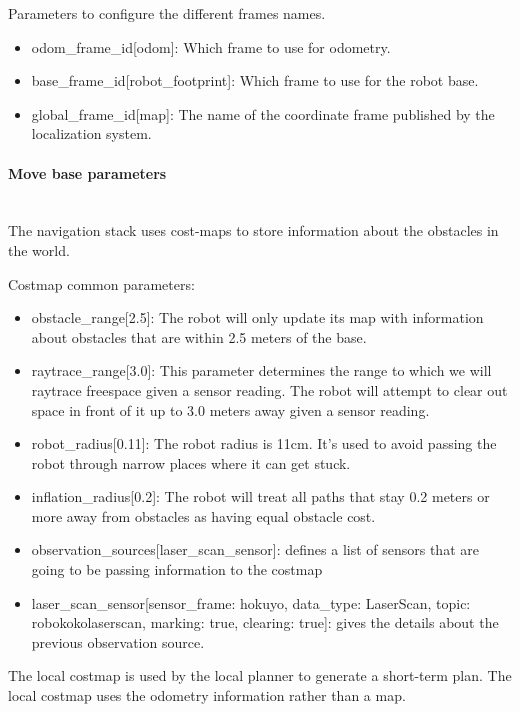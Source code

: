 \documentclass[10pt,journal,compsoc]{IEEEtran}
\begin{document}
Parameters to configure the different frames names.

\begin{itemize}
\item odom\_frame\_id[odom]: Which frame to use for odometry.
\item base\_frame\_id[robot\_footprint]: Which frame to use for the robot base.
\item global\_frame\_id[map]: The name of the coordinate frame published by the localization system.
\end{itemize}

\paragraph{Move base parameters}\mbox{} \\

The navigation stack uses cost-maps to store information about the obstacles in the world.


Costmap common parameters:

\begin{itemize}
\item obstacle\_range[2.5]: The robot will only update its map with information about obstacles that are within 2.5 meters of the base.
\item raytrace\_range[3.0]: This parameter determines the range to which we will raytrace freespace given a sensor reading. The robot will attempt to clear out space in front of it up to 3.0 meters away given a sensor reading.
\item robot\_radius[0.11]: The robot radius is 11cm. It's used to avoid passing the robot through narrow places where it can get stuck.
\item inflation\_radius[0.2]: The robot will treat all paths that stay 0.2 meters or more away from obstacles as having equal obstacle cost.
\item observation\_sources[laser\_scan\_sensor]: defines a list of sensors that are going to be passing information to the costmap 
\item laser\_scan\_sensor[sensor\_frame: hokuyo, data\_type: LaserScan, topic: \/robokoko\/laser\/scan, marking: true, clearing: true]: gives the details about the previous observation source.
\end{itemize}

The local costmap is used by the local planner to generate a short-term plan. The local costmap uses the odometry information rather than a map.
\end{document}

